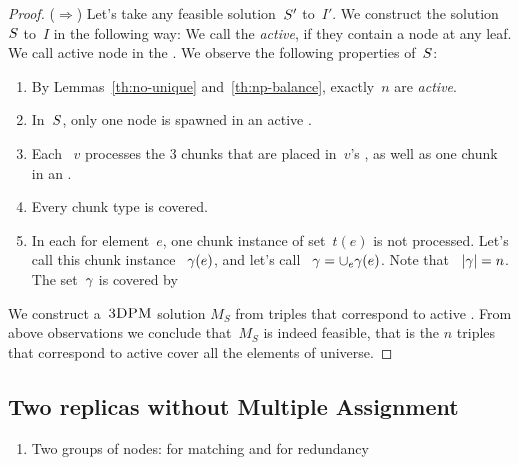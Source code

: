 \begin{proof}
  ($\Rightarrow$) Let's take any feasible solution~$S'$ to~$I'$.
  We construct the solution~$S$ to~$I$ in the following way:
  We call the {\TripleGadget} \textit{active}, if they contain a node
  at any leaf. We call active node in
  {\TripleGadgets} the \ActiveNode.   We observe the following properties of~$S$:
  \begin{enumerate}
    \item By Lemmas~\ref{th:no-unique} and~\ref{th:np-balance}, exactly~$n$ {\TripleGadgets} are \emph{active}.
    \item In~$S$, only one node is spawned in an active
    \TripleGadget.
    \item Each {\ActiveNode}~$v$ processes the 3 chunks that are
    placed in~$v$'s \TripleGadget, as well as one chunk in an \UnqGadget.
    \item Every chunk type is covered.
    \item In each {\ElGadget} for element~$e$, one chunk instance of
    set~$t(e)$ is not processed. Let's call this chunk instance
   ~$\gamma(e)$, and let's call
   ~$\gamma = \cup_e \gamma(e)$. Note that 
   ~$|\gamma| = n$.
    The set~$\gamma$ is covered by \ActiveNodes
  \end{enumerate}

  We construct a~$\textsc{3DPM}$ solution $M_S$ from
  triples that correspond to active \TripleGadgets.
  From above observations we conclude that~$M_S$ is indeed feasible, that is the $n$ triples that correspond to active \TripleGadgets cover all the elements of universe.
\end{proof}










\subsection{Two replicas without Multiple Assignment}\label{ap:tworep-ni}

\begin{enumerate}
  \item Two groups of nodes: for matching and for redundancy
\end{enumerate}